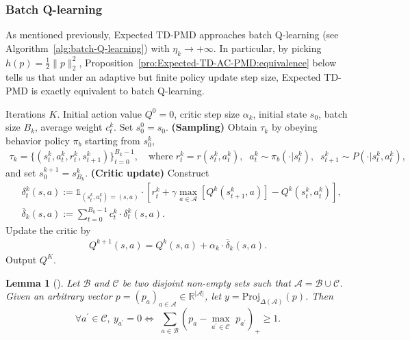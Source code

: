\documentclass[10pt]{article}
\newcommand{\calA}{\mathcal{A}}
\newcommand{\ls}{\left}
\newcommand{\rs}{\right}
\theoremstyle{plain}
\newtheorem{lemma}[theorem]{Lemma}
\theoremstyle{definition}
\begin{document}
\subsubsection{Batch Q-learning}
As mentioned previously, Expected TD-PMD approaches  batch Q-learning  (see Algorithm~\ref{alg:batch-Q-learning}) with $\eta_k \to +\infty$. In particular, by picking $h(p)=\frac{1}{2}\| p \|_2^2$,  Proposition~\ref{pro:Expected-TD-AC-PMD:equivalence} below tells us that under an adaptive but finite policy update step size, Expected TD-PMD is exactly equivalent to batch Q-learning.

\begin{algorithm}[ht!]
    \small
    \caption{Batch Q-learning}
    \label{alg:batch-Q-learning}
\begin{algorithmic}
     Iterations $K$. Initial action value $Q^0=0$, critic step size $\alpha_k$, initial state $s_0$, batch size $B_k$, average weight $c_t^k$.
    \STATE Set $s_0^0 = s_0$.
    \STATE \textbf{(Sampling)} Obtain $\tau_k$ by obeying behavior policy $\pi_b$ starting from $s_0^k$,
    \begin{align*}
        \tau_k = \{ (s_t^k, a_t^k, r^k_t, s_{t+1}^k) \}_{t=0}^{B_k-1}, \quad \mbox{where} \; r^k_t = r(s^k_t, a^k_t), \;\; a^k_t \sim \pi_b(\cdot|s_t^k), \;\; s^k_{t+1} \sim P(\cdot| s_t^k, a_t^k),
    \end{align*}
    and set $s_0^{k+1} = s_{B_k}^k$.
    \STATE \textbf{(Critic update)} Construct
    \begin{align*}
        &\delta_t^k(s,a) := \mathds{1}_{(s^k_t,a^k_t)=(s,a) } \cdot\ls[r_t^k + \gamma \max_{a\in\calA} \ls[Q^k(s_{t+1}^k, a)\rs] - Q^k(s^k_t, a^k_t)\rs], \\
        &\bar\delta_k(s,a) := \sum_{t=0}^{B_k-1} c_t^k\cdot \delta_t^k(s,a).
    \end{align*}
    \STATE Update the critic by
    \begin{align*}
        Q^{k+1}(s,a) = Q^k(s,a) + \alpha_k \cdot \bar\delta_k(s,a).
    \end{align*}
    \ENDFOR
    \STATE Output $Q^K$.
\end{algorithmic}
\end{algorithm}

\begin{lemma}[]
    Let $\mathcal{B}$ and $\mathcal{C}$ be two disjoint non-empty sets such that $\mathcal{A} =\mathcal{B}\cup \mathcal{C}$. Given an arbitrary vector $
    p=\left( p_a \right) _{a\in \mathcal{A}}\in \mathbb{R} ^{\left| \mathcal{A} \right|}$, let $y=\mathrm{Proj}_{\Delta \left( \mathcal{A} \right)}\left( p \right)$. Then
    \[
    \forall a^\prime\in \mathcal{C},~ y_{a^\prime}=0 \Leftrightarrow \,\,\sum_{a\in \mathcal{B}}{\left( p_a-\underset{a^{\prime}\in \mathcal{C}}{\max}\,\,p_{a^{\prime}} \right) _+}\ge 1.
    \]
    \label{lem:proj-property}    
\end{lemma}
\end{document}
